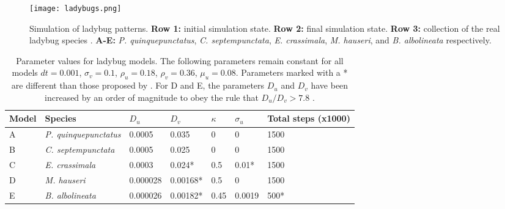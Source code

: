 \begin{figure}[!ht]
	\centering
	\texttt{[image: ladybugs.png]}
	\caption{Simulation of ladybug patterns. \textbf{Row 1:} initial simulation state. \textbf{Row 2:} final simulation state. \textbf{Row 3:} collection of the real ladybug species \cite{Chen2008}. \textbf{A-E:} \textit{P. quinquepunctatus}, \textit{C. septempunctata}, \textit{E. crassimala}, \textit{M. hauseri}, and \textit{B. albolineata} respectively. }
	\label{fig:ladyBugPatterns}
\end{figure}

\begin{table}[p]
	\centering
	\begin{tabular}{|l|l|l|l|l|l|l|}
	\hline
	Model & Species                    &$D_u$   &$D_v$    &$\kappa$ &$\sigma_u$ &Total steps (x1000)\\ \hline 
	A     &\textit{P. quinquepunctatus}&0.0005  &0.035    &0        &0          & 1500              \\ \hline
	B     &\textit{C. septempunctata}  &0.0005  &0.025    &0        &0          & 1500              \\ \hline
	C     &\textit{E. crassimala}      &0.0003  &0.024*   &0.5      &0.01*      & 1500              \\ \hline
	D     &\textit{M. hauseri}         &0.000028&0.00168* &0.5      &0          & 1500              \\ \hline
	E     &\textit{B. albolineata}     &0.000026&0.00182* &0.45     &0.0019     & 500*              \\
	\hline
	\end{tabular}
	\caption {Parameter values for ladybug models. The following parameters remain constant for all models $dt = 0.001$, $\sigma_v= 0.1$, $\rho_u = 0.18$, $\rho_v = 0.36$, $\mu_u = 0.08$. Parameters marked with a * are different than those proposed by \cite{Liaw2001}. For D and E, the parameters $D_u$ and $D_v$ have been increased by an order of magnitude to obey the rule that $D_u / D_v > 7.8$ \cite{Liaw2001}.}
	\label{tab:ladyBugParameters}
\end{table}

